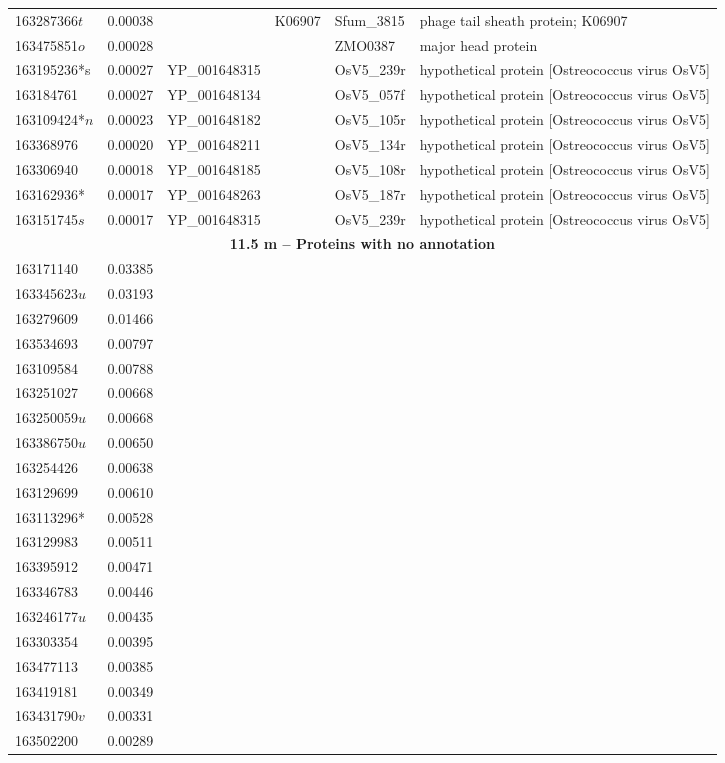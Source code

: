 \begin{landscape}
\begin{longtable}{p{1.8cm}p{0.9cm}p{2.2cm}p{1cm}p{2.8cm}p{13.4cm}}
163287366$t$&0.00038&&K06907&Sfum\_3815&phage tail sheath protein; K06907 \\
163475851$o$&0.00028&&&ZMO0387&major head protein \\
163195236*s&0.00027&YP\_001648315&&OsV5\_239r&hypothetical protein [Ostreococcus virus OsV5] \\
163184761&0.00027&YP\_001648134&&OsV5\_057f&hypothetical protein [Ostreococcus virus OsV5] \\
163109424*$n$&0.00023&YP\_001648182&&OsV5\_105r&hypothetical protein [Ostreococcus virus OsV5] \\
163368976&0.00020&YP\_001648211&&OsV5\_134r&hypothetical protein [Ostreococcus virus OsV5] \\
163306940&0.00018&YP\_001648185&&OsV5\_108r&hypothetical protein [Ostreococcus virus OsV5] \\
163162936*&0.00017&YP\_001648263&&OsV5\_187r&hypothetical protein [Ostreococcus virus OsV5] \\
163151745$s$&0.00017&YP\_001648315&&OsV5\_239r&hypothetical protein [Ostreococcus virus OsV5] \\
\toprule
\multicolumn{6}{c}{\textbf{11.5 m -- Proteins with no annotation}} \\
\midrule
163171140&0.03385&&&& \\
163345623$u$&0.03193&&&& \\
163279609&0.01466&&&& \\
163534693&0.00797&&&& \\
163109584&0.00788&&&& \\
163251027&0.00668&&&& \\
163250059$u$&0.00668&&&& \\
163386750$u$&0.00650&&&& \\
163254426&0.00638&&&& \\
163129699&0.00610&&&& \\
163113296*&0.00528&&&& \\
163129983&0.00511&&&& \\
163395912&0.00471&&&& \\
163346783&0.00446&&&& \\
163246177$u$&0.00435&&&& \\
163303354&0.00395&&&& \\
163477113&0.00385&&&& \\
163419181&0.00349&&&& \\
163431790$v$&0.00331&&&& \\
163502200&0.00289&&&& \\

\end{longtable}
\end{landscape}
